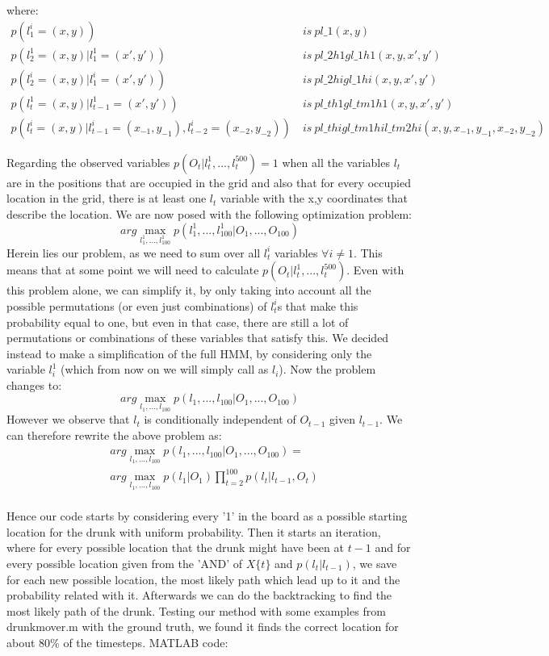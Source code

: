 where:\\
\begin{align*}
p(l_1^i=(x,y))&\ is\ pl\_1(x,y)\\
p(l_2^1=(x,y)|l_1^1=(x',y'))&\ is\ pl\_2h1gl\_1h1(x,y,x',y')\\
p(l_2^i=(x,y)|l_1^i=(x',y'))&\ is\ pl\_2higl\_1hi(x,y,x',y')\\
p(l_t^1=(x,y)|l_{t-1}^1=(x',y'))&\ is\ pl\_th1gl\_tm1h1(x,y,x',y')\\
p(l_t^i=(x,y)|l_{t-1}^i=(x_{-1},y_{-1}),l_{t-2}^i=(x_{-2},y_{-2}))&\ is\ pl\_thigl\_tm1hil\_tm2hi(x,y,x_{-1},y_{-1},x_{-2},y_{-2})
\end{align*}

Regarding the observed variables $p(O_t|l_t^1,...,l_t^{500})=1$ when all the variables $l_t$ are in the positions that are occupied in the grid and also that for every occupied location in the grid, there is at least one $l_t$ variable with the x,y coordinates that describe the location. We are now posed with the following optimization problem:
$$arg\max_{l_1^1,...,l_{100}^1}p(l_1^1,...,l_{100}^1 | O_1,...,O_{100})$$
Herein lies our problem, as we need to sum over all $l_t^i$ variables $\forall i \neq 1$. This means that at some point we will need to calculate $p(O_t|l_t^1,...,l_t^{500})$. Even with this problem alone, we can simplify it, by only taking into account all the possible permutations (or even just combinations) of $l_t^i$s that make this probability equal to one, but even in that case, there are still a lot of permutations or combinations of these variables that satisfy this. We decided instead to make a simplification of the full HMM, by considering only the variable $l_i^1$ (which from now on we will simply call as $l_i$). Now the problem changes to:
$$arg\max_{l_1,...,l_{100}}p(l_1,...,l_{100} | O_1,...,O_{100})$$
However we observe that $l_t$ is conditionally independent of $O_{t-1}$ given $l_{t-1}$. We can therefore rewrite the above problem as:
\begin{align*}
&arg\max_{l_1,...,l_{100}}p(l_1,...,l_{100} | O_1,...,O_{100})=\\
&arg\max_{l_1,...,l_{100}}p(l_1|O_1)\prod_{t=2}^{100}p(l_t|l_{t-1},O_t)\\
\end{align*}

Hence our code starts by considering every '1' in the board as a possible starting location for the drunk with uniform probability. Then it starts an iteration, where for every possible location that the drunk might have been at $t-1$ and for every possible location given from the 'AND' of $X\{t\}$ and $p(l_t|l_{t-1})$, we save for each new possible location, the most likely path which lead up to it and the probability related with it. Afterwards we can do the backtracking to find the most likely path of the drunk. Testing our method with some examples from drunkmover.m with the ground truth, we found it finds the correct location for about 80\% of the timesteps. MATLAB code:\\

